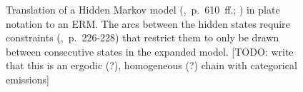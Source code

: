 \vspace*{1em}
\begin{figure}[h!]
\centering
\scalebox{\tikzScale}{\adjustTikzSize }
\caption[Hidden Markov model in plate notation to ERM translation]{Translation of a Hidden Markov model (\cite{bishop2006pattern},~p.~610~ff.; \cite{baum1970maximization}) in plate notation to an ERM. The arcs between the hidden states require constraints (\cite{heckerman2007probabilistic},~p.~226-228) that restrict them to only be drawn between consecutive states in the expanded model. [TODO: write that this is an ergodic (?), homogeneous (?) chain with categorical emissions]}\label{fig:appendix_hmm}
\end{figure}

